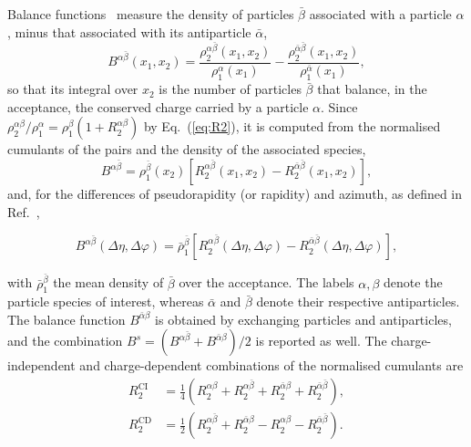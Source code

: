 Balance functions~\cite{Bass:2000az} measure the density of particles $\bar\beta$ associated with a particle $\alpha$,
minus that associated with its antiparticle $\bar\alpha$,
\begin{equation}
  B^{\alpha\bar\beta}(x_1,x_2) = \frac{\rho_2^{\alpha\bar\beta}(x_1,x_2)}{\rho_1^{\alpha}(x_1)}
                                - \frac{\rho_2^{\bar\alpha\bar\beta}(x_1,x_2)}{\rho_1^{\bar\alpha}(x_1)} ,
  \label{eq:BFdef}
\end{equation}
so that its integral over $x_2$ is the number of particles $\bar\beta$ that balance, in the acceptance, the
conserved charge carried by a particle $\alpha$. Since $\rho_2^{\alpha\beta}/\rho_1^\alpha = \rho_1^\beta(1+R_2^{\alpha\beta})$ by Eq.~(\ref{eq:R2}), it is computed from the normalised cumulants of
the pairs and the density of the associated species,
\begin{equation}
  B^{\alpha\bar\beta} = \rho_1^{\bar\beta}(x_2)\left[R_2^{\alpha\bar\beta}(x_1,x_2) - R_2^{\bar\alpha\bar\beta}(x_1,x_2)\right],
\end{equation}
and, for the differences of pseudorapidity (or rapidity) and azimuth, as defined in Ref.~\cite{Pruneau:2023zhl},
\begin{widetext}
\begin{equation}
  \label{eq:BF}
  B^{\alpha \bar{\beta}}(\Delta \eta, \Delta \varphi) = \bar\rho_1^{\bar{\beta}}  \left[ R_2^{\alpha\bar{\beta}}(\Delta \eta, \Delta \varphi) - R_2^{\bar{\alpha}\bar{\beta}}(\Delta \eta, \Delta \varphi) \right],
\end{equation}
\end{widetext}
with $\bar\rho_1^{\bar\beta}$ the mean density of $\bar\beta$ over the acceptance. The labels $\alpha, \beta$ denote the
particle species of interest, whereas $\bar\alpha$ and $\bar\beta$ denote their respective antiparticles. The balance
function $B^{\bar\alpha\beta}$ is obtained by exchanging particles and antiparticles, and the combination
$B^{s} = (B^{\alpha\bar\beta}+B^{\bar\alpha\beta})/2$ is reported as well. The charge-independent and
charge-dependent combinations of the normalised cumulants are
\begin{align}
  R_2^{\mathrm{CI}} & = \tfrac14\left(R_2^{\alpha\beta}+R_2^{\alpha\bar\beta}+R_2^{\bar\alpha\beta}+R_2^{\bar\alpha\bar\beta}\right), \\
  R_2^{\mathrm{CD}} & = \tfrac12\left(R_2^{\alpha\bar\beta}+R_2^{\bar\alpha\beta}-R_2^{\alpha\beta}-R_2^{\bar\alpha\bar\beta}\right).
\end{align}

